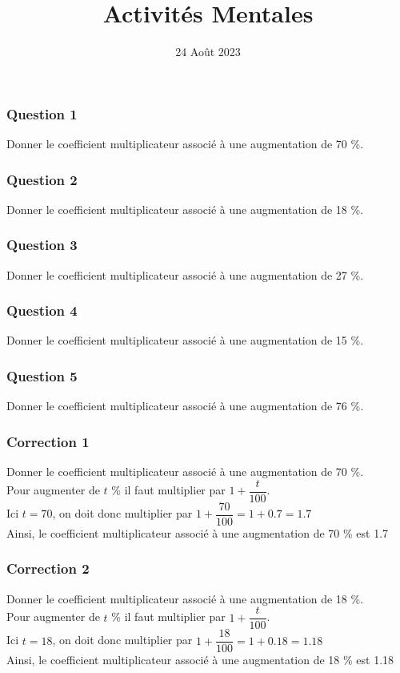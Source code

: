 \documentclass[15pt, mathserif]{beamer}
\title{Activités Mentales}
\date{24 Août 2023}
\begin{document}
\begin{frame}
    \titlepage
\end{frame}

\begin{frame} 
	\frametitle{Question 1}
Donner le coefficient multiplicateur associé à une augmentation de 70 \%.\end{frame}


\begin{frame} 
	\frametitle{Question 2}
Donner le coefficient multiplicateur associé à une augmentation de 18 \%.\end{frame}


\begin{frame} 
	\frametitle{Question 3}
Donner le coefficient multiplicateur associé à une augmentation de 27 \%.\end{frame}


\begin{frame} 
	\frametitle{Question 4}
Donner le coefficient multiplicateur associé à une augmentation de 15 \%.\end{frame}


\begin{frame} 
	\frametitle{Question 5}
Donner le coefficient multiplicateur associé à une augmentation de 76 \%.\end{frame}


\begin{frame}
\vspace{-10mm}
	\frametitle{Correction 1}
Donner le coefficient multiplicateur associé à une augmentation de 70 \%. \\ \bigskip 
 Pour augmenter de $t$ \%  il faut multiplier par $1+\dfrac{t}{100}$. \\ \bigskip Ici $t=70$, on doit donc multiplier par  $1+\dfrac{70}{100}=1+0.7=1.7$ \\ \bigskip Ainsi, le coefficient multiplicateur associé à une augmentation de 70 \% est 1.7\end{frame}


\begin{frame}
\vspace{-10mm}
	\frametitle{Correction 2}
Donner le coefficient multiplicateur associé à une augmentation de 18 \%. \\ \bigskip 
 Pour augmenter de $t$ \%  il faut multiplier par $1+\dfrac{t}{100}$. \\ \bigskip Ici $t=18$, on doit donc multiplier par  $1+\dfrac{18}{100}=1+0.18=1.18$ \\ \bigskip Ainsi, le coefficient multiplicateur associé à une augmentation de 18 \% est 1.18\end{frame}
\end{document}
